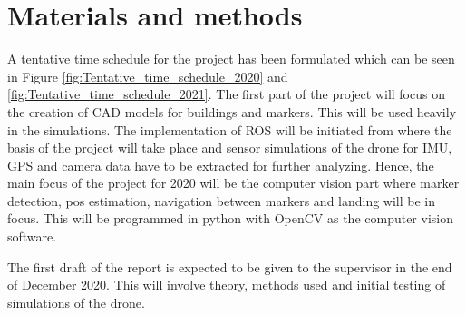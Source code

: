 \documentclass[../Head/Report.tex]{subfiles}
\begin{document}
\section{Materials and methods}

A tentative time schedule for the project has been formulated which can be seen in Figure \ref{fig:Tentative_time_schedule_2020} and \ref{fig:Tentative_time_schedule_2021}. The first part of the project will focus on the creation of CAD models for buildings and markers. This will be used heavily in the simulations. The implementation of ROS will be initiated from where the basis of the project will take place and sensor simulations of the drone for IMU, GPS and camera data have to be extracted for further analyzing. Hence, the main focus of the project for 2020 will be the computer vision part where marker detection, pos estimation, navigation between markers and landing will be in focus. This will be programmed in python with OpenCV as the computer vision software. 

The first draft of the report is expected to be given to the supervisor in the end of December 2020. This will involve theory, methods used and initial testing of simulations of the drone.     

%
\newcommand{\myWeek}{\themyWeekNum
    \stepcounter{myWeekNum}
    \ifnum\themyWeekNum=53
         \setcounter{myWeekNum}{1}
    \else\fi
}
\end{document}
